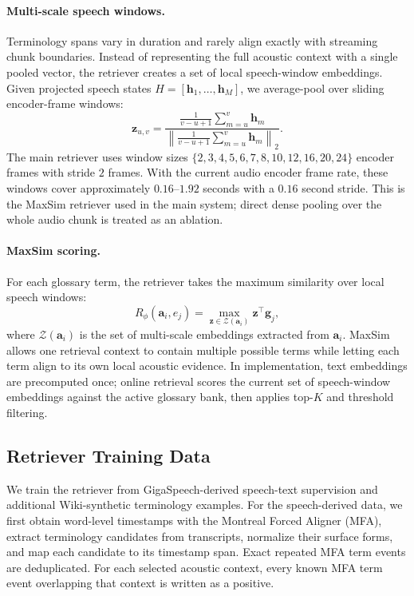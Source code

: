 \paragraph{Multi-scale speech windows.}
Terminology spans vary in duration and rarely align exactly with streaming chunk boundaries. Instead of representing the full acoustic context with a single pooled vector, the retriever creates a set of local speech-window embeddings. Given projected speech states $H=[\mathbf{h}_1,\ldots,\mathbf{h}_M]$, we average-pool over sliding encoder-frame windows:
\begin{equation}
  \mathbf{z}_{u,v}
  =
  \frac{
    \frac{1}{v-u+1}\sum_{m=u}^{v}\mathbf{h}_m
  }{
    \left\|\frac{1}{v-u+1}\sum_{m=u}^{v}\mathbf{h}_m\right\|_2
  }.
\end{equation}
The main retriever uses window sizes
$\{2,3,4,5,6,7,8,10,12,16,20,24\}$ encoder frames with stride $2$ frames. With the current audio encoder frame rate, these windows cover approximately $0.16$--$1.92$ seconds with a $0.16$ second stride. This is the MaxSim retriever used in the main system; direct dense pooling over the whole audio chunk is treated as an ablation.

\paragraph{MaxSim scoring.}
For each glossary term, the retriever takes the maximum similarity over local speech windows:
\begin{equation}
  R_\phi(\mathbf{a}_i,e_j)
  =
  \max_{\mathbf{z}\in\mathcal{Z}(\mathbf{a}_i)}
  \mathbf{z}^{\top}\mathbf{g}_j,
\end{equation}
where $\mathcal{Z}(\mathbf{a}_i)$ is the set of multi-scale embeddings extracted from $\mathbf{a}_i$. MaxSim allows one retrieval context to contain multiple possible terms while letting each term align to its own local acoustic evidence. In implementation, text embeddings are precomputed once; online retrieval scores the current set of speech-window embeddings against the active glossary bank, then applies top-$K$ and threshold filtering.

\subsection{Retriever Training Data}
\label{sec:retriever_data}

We train the retriever from GigaSpeech-derived speech-text supervision and additional Wiki-synthetic terminology examples. For the speech-derived data, we first obtain word-level timestamps with the Montreal Forced Aligner (MFA), extract terminology candidates from transcripts, normalize their surface forms, and map each candidate to its timestamp span. Exact repeated MFA term events are deduplicated. For each selected acoustic context, every known MFA term event overlapping that context is written as a positive.

